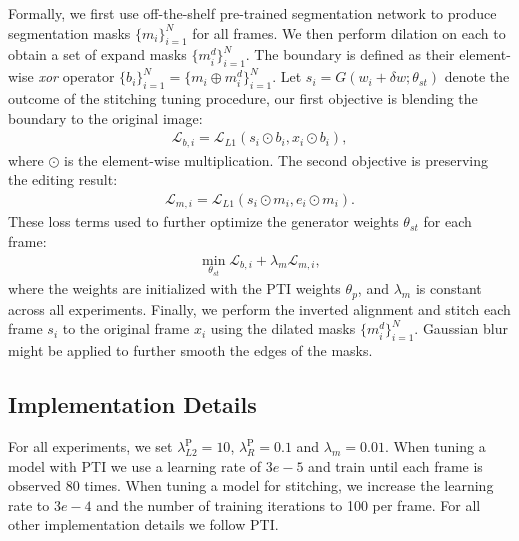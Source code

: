 Formally, we first use off-the-shelf pre-trained segmentation network \cite{yu2021bisenet} to produce segmentation masks $\{m_i\}^N_{i=1}$ for all frames. We then perform dilation on each to obtain a set of expand masks $\{m^d_i\}^N_{i=1}$. The boundary is defined as their element-wise \textit{xor} operator $\{b_i\}^N_{i=1} = \{m_i \oplus m^d_i\}^N_{i=1}$. Let $s_i = G(w_i+\delta w; \theta_{st})$ denote the outcome of the stitching tuning procedure, our first objective is blending the boundary to the original image:
\begin{align}
\mathcal{L}_{b,i} = \mathcal{L}_{L1}(s_i \odot b_i, x_i \odot b_i),
\end{align}
where $\odot$ is the element-wise multiplication. The second objective is preserving the editing result:
\begin{align}
\mathcal{L}_{m,i} = \mathcal{L}_{L1}(s_i \odot m_i, e_i \odot m_i).
\end{align}
These loss terms used to further optimize the generator weights $\theta_{st}$ for each frame:
\begin{align}
\underset{\theta_{st}}{\min} \mathcal{L}_{b,i} + \lambda_m\mathcal{L}_{m,i} , 
\end{align}
where the weights are initialized with the PTI weights $\theta_p$, and  $\lambda_m$ is constant across all experiments. Finally, we perform the inverted alignment and stitch each frame $s_i$ to the original frame $x_i$ using the dilated masks $\{m^d_i\}^N_{i=1}$. Gaussian blur might be applied to further smooth the edges of the masks.


\subsection{Implementation Details}

For all experiments, we set $\lambda^{\text{P}}_{L2} = 10$, $\lambda^{\text{P}}_R = 0.1 $ and $\lambda_m = 0.01$. When tuning a model with PTI we use a learning rate of $3e-5$ and train until each frame is observed 80 times. When tuning a model for stitching, we increase the learning rate to $3e-4$ and the number of training iterations to 100 per frame. For all other implementation details we follow PTI.




